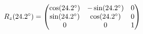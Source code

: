\documentclass[preview]{standalone}
\begin{document}
\begin{align*}
\special{dvisvgm:raw <g id='unique000'>}R_z(24.2^\circ) = \begin{pmatrix} \cos(24.2^\circ) & -\sin(24.2^\circ) & 0 \\ \sin(24.2^\circ) & \cos(24.2^\circ) & 0 \\ 0 & 0 & 1 \end{pmatrix}\special{dvisvgm:raw </g>}
\end{align*}
\end{document}
